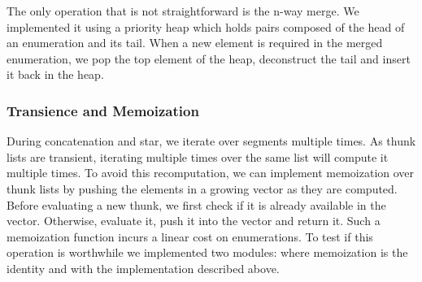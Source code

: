 
The only operation that is not straightforward is the n-way merge.
We implemented it using a priority heap which holds pairs composed
of the head of an enumeration and its tail. When a new element is required in the
merged enumeration, we pop the top element of the heap, deconstruct
the tail and insert it back in the heap.


\subsubsection{Transience and Memoization}

During concatenation and star, we iterate over segments multiple times.
As thunk lists are transient, iterating multiple times over the same list
will compute it multiple times. To avoid this recomputation, we can implement memoization
over thunk lists by pushing the elements in a growing vector as they are
computed. Before evaluating a new thunk, we first check if it is already available
in the vector. Otherwise, evaluate it, push it into the vector and return it.
%
Such a memoization function incurs a linear cost on enumerations. To test
if this operation is worthwhile we implemented two modules:
 where memoization is the identity and 
with the implementation described above.

